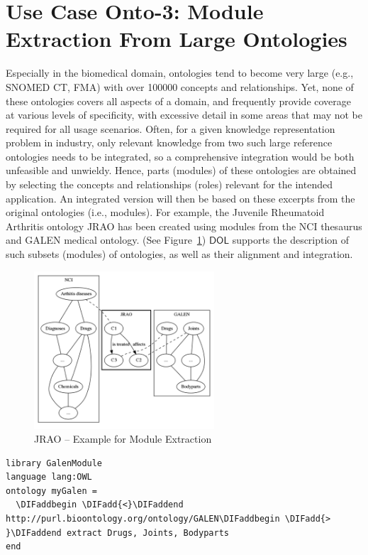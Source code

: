 \documentclass[10pt,fleqn,final]{scrreprt}
\newcommand*{\DOL}{\ensuremath{\mathsf{DOL}}\xspace}
\newcommand{\figurerefname}{Figure}
\newcommand{\fref}[1]{\figurerefname~\ref{#1}}
\newenvironment{definitions}[0]{\medskip }{}
\providecommand{\DIFadd}[1]{{\protect\color{blue}\uwave{#1}}} %
\providecommand{\DIFaddbegin}{} %
\providecommand{\DIFaddend}{} %
\providecommand{\DIFdelbegin}{} %
\providecommand{\DIFdelend}{} %
\begin{document}
\begin{definitions}
\section{Use Case Onto-3: Module Extraction From Large Ontologies}\label{onto-3}
Especially in the biomedical domain, ontologies tend to become very large (e.g., SNOMED CT, FMA) 
with over 100000 concepts and relationships. Yet, none of these ontologies covers all aspects of a 
domain, and frequently provide coverage at various levels of specificity, with excessive detail in 
some areas that may not be required for all usage scenarios. Often, for a given knowledge 
representation problem in industry, only relevant knowledge from two such large reference 
ontologies needs to be integrated, so a comprehensive integration would be both unfeasible and 
unwieldy. Hence, parts (modules) of these ontologies are obtained by selecting the concepts and 
relationships (roles) relevant for the intended application. An integrated version will then be 
based on these excerpts from the original ontologies (i.e., modules). For example, the Juvenile 
Rheumatoid Arthritis ontology JRAO has been created using modules from the NCI thesaurus and GALEN 
medical ontology. (See \fref{JRAO}) \DOL  
supports the description of such subsets (modules) of ontologies, as well as their alignment and 
integration.


\begin{figure}[htbp]
\begin{center}
\includegraphics[width=0.6\textwidth]{useCaseOnto3.png}
\caption{JRAO  -- Example for Module Extraction}
\label{JRAO}
\end{center}
\end{figure}


\DIFdelbegin %
\DIFdelend \DIFaddbegin \begin{lstlisting}[basicstyle=\ttfamily,language=dolText,escapechar=@,mathescape]
\DIFaddend %prefix( lang:  <http://purl.net/DOL/languages/> )%
library GalenModule
language lang:OWL
ontology myGalen = 
  \DIFaddbegin \DIFadd{<}\DIFaddend http://purl.bioontology.org/ontology/GALEN\DIFaddbegin \DIFadd{> }\DIFaddend extract Drugs, Joints, Bodyparts
end


\end{lstlisting}
\end{definitions}
\end{document}
